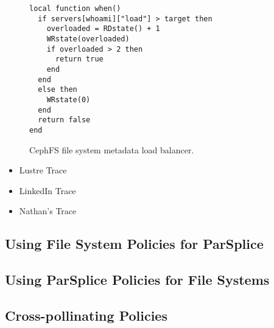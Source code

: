 \begin{figure}[t]
\footnotesize
\begin{verbatim}
local function when()
  if servers[whoami]["load"] > target then
    overloaded = RDstate() + 1
    WRstate(overloaded)
    if overloaded > 2 then
      return true
    end
  end
  else then
    WRstate(0)
  end
  return false
end
\end{verbatim}
\caption{CephFS file system metadata load balancer.\label{lua:cephfs}}
\end{figure}

\begin{itemize}
  \item Lustre Trace
  \item LinkedIn Trace
  \item Nathan's Trace
\end{itemize}

\subsection{Using File System Policies for ParSplice}
\subsection{Using ParSplice Policies for File Systems}

\subsection{Cross-pollinating Policies}

